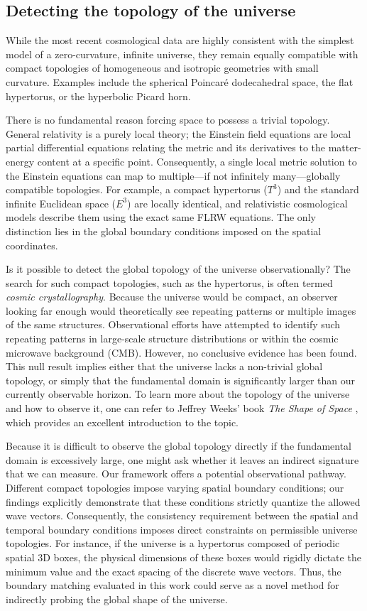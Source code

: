 \subsection{Detecting the topology of the universe}

While the most recent cosmological data are highly consistent with the simplest model of a zero-curvature, infinite universe, they remain equally compatible with compact topologies of homogeneous and isotropic geometries with small curvature. Examples include the spherical Poincaré dodecahedral space, the flat hypertorus, or the hyperbolic Picard horn.

There is no fundamental reason forcing space to possess a trivial topology. General relativity is a purely local theory; the Einstein field equations are local partial differential equations relating the metric and its derivatives to the matter-energy content at a specific point. Consequently, a single local metric solution to the Einstein equations can map to multiple—if not infinitely many—globally compatible topologies. For example, a compact hypertorus ($T^3$) and the standard infinite Euclidean space ($E^3$) are locally identical, and relativistic cosmological models describe them using the exact same FLRW equations. The only distinction lies in the global boundary conditions imposed on the spatial coordinates.

Is it possible to detect the global topology of the universe observationally? The search for such compact topologies, such as the hypertorus, is often termed \textit{cosmic crystallography}. Because the universe would be compact, an observer looking far enough would theoretically see repeating patterns or multiple images of the same structures. Observational efforts have attempted to identify such repeating patterns in large-scale structure distributions or within the cosmic microwave background (CMB). However, no conclusive evidence has been found. This null result implies either that the universe lacks a non-trivial global topology, or simply that the fundamental domain is significantly larger than our currently observable horizon. To learn more about the topology of the universe and how to observe it, one can refer to Jeffrey Weeks' book \textit{The Shape of Space} \cite{weeks2020shape}, which provides an excellent introduction to the topic.

Because it is difficult to observe the global topology directly if the fundamental domain is excessively large, one might ask whether it leaves an indirect signature that we can measure. Our framework offers a potential observational pathway. Different compact topologies impose varying spatial boundary conditions; our findings explicitly demonstrate that these conditions strictly quantize the allowed wave vectors. Consequently, the consistency requirement between the spatial and temporal boundary conditions imposes direct constraints on permissible universe topologies. For instance, if the universe is a hypertorus composed of periodic spatial 3D boxes, the physical dimensions of these boxes would rigidly dictate the minimum value and the exact spacing of the discrete wave vectors. Thus, the boundary matching evaluated in this work could serve as a novel method for indirectly probing the global shape of the universe.


